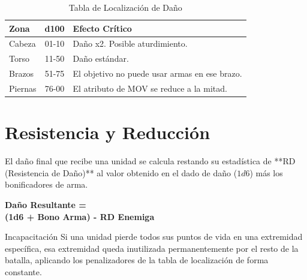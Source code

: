 \begin{table}[h]
\centering
\begin{tabularx}{\linewidth}{|l|c|X|}
\hline
\rowcolor{WarhammerRed!20} \textbf{Zona} & \textbf{d100} & \textbf{Efecto Crítico} \\ \hline
Cabeza & 01-10 & Daño x2. Posible aturdimiento. \\ \hline
Torso  & 11-50 & Daño estándar. \\ \hline
Brazos & 51-75 & El objetivo no puede usar armas en ese brazo. \\ \hline
Piernas& 76-00 & El atributo de MOV se reduce a la mitad. \\ \hline
\end{tabularx}
\caption{Tabla de Localización de Daño}
\end{table}

\section{Resistencia y Reducción}
El daño final que recibe una unidad se calcula restando su estadística de **RD (Resistencia de Daño)** al valor obtenido en el dado de daño ($1d6$) más los bonificadores de arma.

\begin{tcolorbox}[colback=gray!10, colframe=black, title=Cálculo Final]
\centering
\textbf{Daño Resultante =\\ (1d6 + Bono Arma) - RD Enemiga}
\end{tcolorbox}

\begin{reglaespecial}{Incapacitación}
Si una unidad pierde todos sus puntos de vida en una extremidad específica, esa extremidad queda inutilizada permanentemente por el resto de la batalla, aplicando los penalizadores de la tabla de localización de forma constante.
\end{reglaespecial}